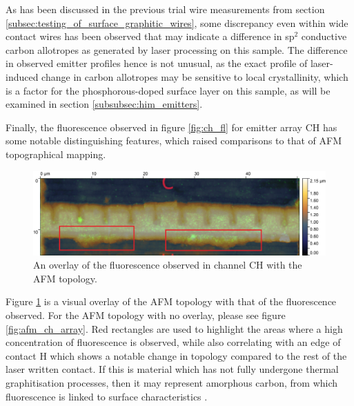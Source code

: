 \begin{refsection}
As has been discussed in the previous trial wire measurements from section \ref{subsec:testing_of_surface_graphitic_wires}, some discrepancy even within wide contact wires has been observed that may indicate a difference in sp$^{2}$ conductive carbon allotropes as generated by laser processing on this sample. The difference in observed emitter profiles hence is not unusual, as the exact profile of laser-induced change in carbon allotropes may be sensitive to local crystallinity, which is a factor for the phosphorous-doped surface layer on this sample, as will be examined in section \ref{subsubsec:him_emitters}.

Finally, the fluorescence observed in figure \ref{fig:ch_fl} for emitter array CH has some notable distinguishing features, which raised comparisons to that of AFM topographical mapping.

\begin{figure}[H]
    \centering
    \includegraphics[width=0.8\linewidth]{Chapter7/Figs/Raster/CH_cropped_overlay.jpg}
    \caption{An overlay of the fluorescence observed in channel CH with the AFM topology.}
    \label{fig:ch_overlay}
\end{figure}

Figure \ref{fig:ch_overlay} is a visual overlay of the AFM topology with that of the fluorescence observed. For the AFM topology with no overlay, please see figure \ref{fig:afm_ch_array}. Red rectangles are used to highlight the areas where a high concentration of fluorescence is observed, while also correlating with an edge of contact H which shows a notable change in topology compared to the rest of the laser written contact. If this is material which has not fully undergone thermal graphitisation processes, then it may represent amorphous carbon, from which fluorescence is linked to surface characteristics \cite{Siddique2018, Li2011}.


\end{refsection}
